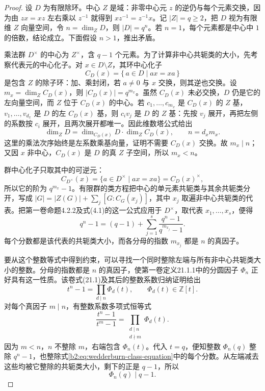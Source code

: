 \begin{proof}
	设 \(D\) 为有限除环。中心 \(Z\) 是域：非零中心元 \(z\) 的逆仍与每个元素交换，因为由 \(zx=xz\) 左右乘以 \(z^{-1}\) 就得到 \(xz^{-1}=z^{-1}x\)。记 \(|Z|=q\ge2\)，把 \(D\) 视为有限维 \(Z\) 向量空间，令 \(n=\dim_ZD\)，则 \(|D|=q^n\)。若 \(n=1\)，每个元素都是中心中 \(1\) 的倍数，结论成立。下面假设 \(n>1\)，推出矛盾。

	乘法群 \(D^\times\) 的中心为 \(Z^\times\)，含 \(q-1\) 个元素。为了计算非中心共轭类的大小，先考察代表元的中心化子。对 \(x\in D\setminus Z\)，其环中心化子
	\[
		C_D(x)=\{\,a\in D\mid ax=xa\,\}
	\]
	是包含 \(Z\) 的除子环：加、乘封闭，若 \(a\ne0\) 与 \(x\) 交换，则其逆也交换。设 \(m_x=\dim_Z C_D(x)\)，则 \(|C_D(x)|=q^{m_x}\)。虽然 \(C_D(x)\) 未必交换，\(D\) 仍是它的左向量空间，而 \(Z\) 位于 \(C_D(x)\) 的中心。若 \(c_1,\ldots,c_{m_x}\) 是 \(C_D(x)\) 的 \(Z\) 基，\(v_1,\ldots,v_{d_x}\) 是 \(D\) 的左 \(C_D(x)\) 基，则 \(c_i v_j\) 是 \(D\) 的 \(Z\) 基：先按 \(v_j\) 展开，再把左侧的系数按 \(c_i\) 展开，且两次展开都唯一。因此维数塔公式给出
	\[
		\dim_ZD=\dim_{C_D(x)}D\cdot\dim_ZC_D(x), \qquad n=d_xm_x.
	\]
	这里的乘法次序始终是左系数乘基向量，证明不需要 \(C_D(x)\) 交换。故 \(m_x\mid n\)；又因 \(x\) 非中心，\(C_D(x)\) 是 \(D\) 的真 \(Z\) 子空间，所以 \(m_x<n\)。

	群中心化子只取其中的可逆元：
	\[
		C_{D^\times}(x)=\{a\in D^\times\mid ax=xa\}=C_D(x)^\times,
	\]
	所以它的阶为 \(q^{m_x}-1\)。有限群的类方程把中心的单元素共轭类与其余共轭类分开，写成 \(|G|=|Z(G)|+\sum_j[G:C_G(x_j)]\)，其中 \(x_j\) 取遍非中心共轭类的代表。把第一卷命题4.2.2及式(4.1)的这一公式应用于 \(D^\times\)，取代表 \(x_1,\ldots,x_s\)，便得
	\begin{equation}\label{b2:eq:wedderburn-class-equation}
		q^n-1=(q-1)+\sum_{j=1}^s\frac{q^n-1}{q^{m_{x_j}}-1}.
	\end{equation}
	每个分数都是该代表的共轭类大小，而各分母的指数 \(m_{x_j}\) 都是 \(n\) 的真因子。

	要从这个整数等式中得到约束，可以寻找一个同时整除左端与所有非中心共轭类大小的整数。分母的指数都是 \(n\) 的真因子，使第一卷定义21.1.1中的分圆因子 \(\Phi_n\) 正好具有这一性质。该卷式(21.1)及其后的整数系数归纳证明给出
	\[
		t^n-1=\prod_{d\mid n}\Phi_d(t),\qquad \Phi_d(t)\in\mathbb Z[t].
	\]
	对每个真因子 \(m\mid n\)，有整数系数多项式恒等式
	\[
		\frac{t^n-1}{t^m-1}=\prod_{\substack{d\mid n\\d\nmid m}}\Phi_d(t).
	\]
	因为 \(m<n\)，\(n\) 不整除 \(m\)，右端包含 \(\Phi_n(t)\)。代入 \(t=q\)，便知整数 \(\Phi_n(q)\) 整除 \(q^n-1\)，也整除式\eqref{b2:eq:wedderburn-class-equation}中的每个分数。从左端减去这些均被它整除的共轭类大小，剩下的正是 \(q-1\)，所以
	\[
		\Phi_n(q)\mid q-1.
	\]


\end{proof}
